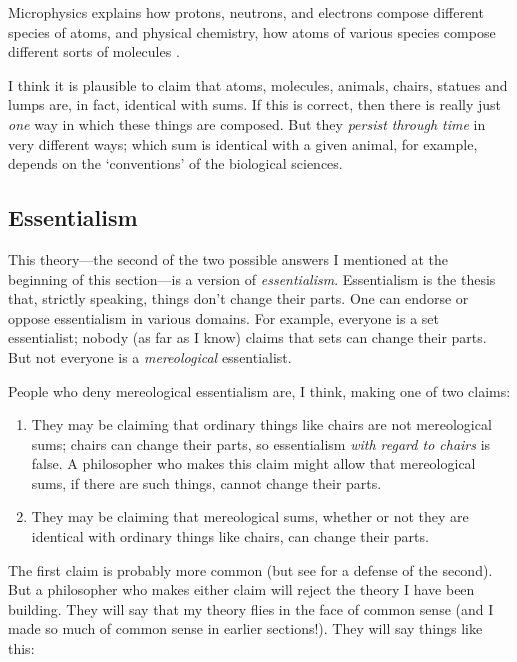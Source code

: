 \documentclass[11pt]{article}
\newenvironment{squote}{%
\begin{spacing}{1}
\begin{list}{}{%
\setlength{\labelwidth}{0pt}%
\rightmargin\leftmargin%
}
\item\relax
}{%
\end{list}%
\end{spacing}
}
\begin{document}
\begin{spacing}{1.5}
\begin{squote}
Microphysics explains how protons, neutrons, and electrons compose
different species of atoms, and physical chemistry, how atoms of
various species compose different sorts of molecules
\citep[706]{rosenberg1993}.
\end{squote}

I think it is plausible to claim that atoms, molecules, animals,
chairs, statues and lumps are, in fact, identical with sums.  If this
is correct, then there is really just {\em one} way in which these
things are composed.  But they {\em persist through time} in very
different ways; which sum is identical with a given animal, for
example, depends on the `conventions' of the biological sciences.

\subsection{Essentialism}
\label{essentialism}
This theory---the second of the two possible answers I mentioned at
the beginning of this section---is a version of {\em essentialism}.
Essentialism is the thesis that, strictly speaking, things don't
change their parts.  One can endorse or oppose essentialism in various
domains.  For example, everyone is a set essentialist; nobody (as far
as I know) claims that sets can change their parts.  But not everyone
is a {\em mereological} essentialist.

People who deny mereological essentialism are, I think, making one of
two claims:

\begin{enumerate}
  \item They may be claiming that ordinary things like chairs are not
    mereological sums; chairs can change their parts, so essentialism
    {\em with regard to chairs} is false.  A philosopher who makes
    this claim might allow that mereological sums, if there are such
    things, cannot change their parts.
  \item They may be claiming that mereological sums, whether or not
    they are identical with ordinary things like chairs, can change
    their parts.
\end{enumerate}

The first claim is probably more common (but see \citet{inwagen2006}
for a defense of the second).  But a philosopher who makes either
claim will reject the theory I have been building.  They will say that
my theory flies in the face of common sense (and I made so much of
common sense in earlier sections!).  They will say things like this:


\end{spacing}
\end{document}
